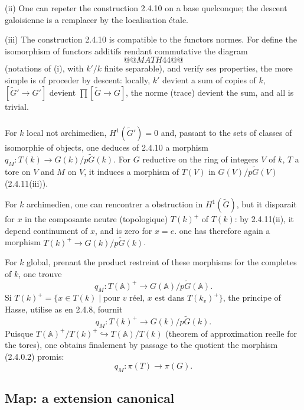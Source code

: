 \documentclass[12pt,a4paper]{article}
\theoremstyle{plain}
\theoremstyle{definition}
\theoremstyle{remark}
\newcommand{\A}{\mathbb{A}}
\begin{document}
(ii) One can repeter the construction 2.4.10 on a base quelconque; the descent galoisienne is a remplacer by the localisation étale.

(iii) The construction 2.4.10 is compatible to the functors normes. For define the isomorphism of functors additifs rendant commutative the diagram
\[
@@MATH44@@
\]
(notations of (i), with $k'/k$ finite separable), and verify ses properties, the more simple is of proceder by descent: locally, $k'$ devient a sum of copies of $k$, $[\tilde{G}' \to G']$ devient $\prod [\tilde{G} \to G]$, the norme (trace) devient the sum, and all is trivial.

\subsubsection{}

For $k$ local not archimedien, $H^1(\tilde{G}') = 0$ and, passant to the sets of classes of isomorphie of objects, one deduces of 2.4.10 a morphism $q_M: T(k) \to G(k)/p\tilde{G}(k)$. For $G$ reductive on the ring of integers $V$ of $k$, $T$ a tore on $V$ and $M$ on $V$, it induces a morphism of $T(V)$ in $G(V)/p\tilde{G}(V)$ (2.4.11(iii)).

For $k$ archimedien, one can rencontrer a obstruction in $H^1(\tilde{G})$, but it disparait for $x$ in the composante neutre (topologique) $T(k)^+$ of $T(k)$: by 2.4.11(ii), it depend continument of $x$, and is zero for $x = e$. one has therefore again a morphism $T(k)^+ \to G(k)/p\tilde{G}(k)$.

For $k$ global, prenant the product restreint of these morphisms for the completes of $k$, one trouve
\begin{equation}\label{eq:2.4.12.1}
q_M: T(\A)^+ \to G(\A)/p\tilde{G}(\A).
\end{equation}
Si $T(k)^+ = \{x \in T(k) \mid \text{pour } v \text{ r\'eel, } x \text{ est dans } T(k_v)^+\}$, the principe of Hasse, utilise as en 2.4.8, fournit
\begin{equation}\label{eq:2.4.12.2}
q_M: T(k)^+ \to G(k)/p\tilde{G}(k).
\end{equation}
Puisque $T(\A)^+/T(k)^+ \hookrightarrow T(\A)/T(k)$ (theorem of approximation reelle for the tores), one obtains finalement by passage to the quotient the morphism (2.4.0.2) promis:
\[
q_M: \pi(T) \to \pi(G).
\]

\subsection{Map: a extension canonical}
\end{document}
